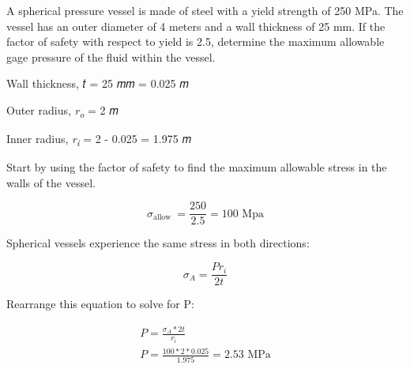 \documentclass[
  letterpaper,
  DIV=11,
  numbers=noendperiod]{scrreprt}
\begin{document}
\begin{tcolorbox}[enhanced jigsaw, breakable, opacityback=0, toptitle=1mm, left=2mm, colback=white, opacitybacktitle=0.6, colframe=quarto-callout-note-color-frame, titlerule=0mm, arc=.35mm, leftrule=.75mm, bottomtitle=1mm, colbacktitle=quarto-callout-note-color!10!white, rightrule=.15mm, title={Example 13.3: Needs title}, bottomrule=.15mm, toprule=.15mm, coltitle=black]

A spherical pressure vessel is made of steel with a yield strength of
250 MPa. The vessel has an outer diameter of 4 meters and a wall
thickness of 25 mm. If the factor of safety with respect to yield is
2.5, determine the maximum allowable gage pressure of the fluid within
the vessel.

\begin{tcolorbox}[enhanced jigsaw, breakable, opacityback=0, toptitle=1mm, left=2mm, colback=white, opacitybacktitle=0.6, colframe=quarto-callout-note-color-frame, titlerule=0mm, arc=.35mm, leftrule=.75mm, bottomtitle=1mm, colbacktitle=quarto-callout-note-color!10!white, rightrule=.15mm, title={Solution}, bottomrule=.15mm, toprule=.15mm, coltitle=black]

Wall thickness, 𝑡 = 25 𝑚𝑚 = 0.025 𝑚

Outer radius, \emph{r\textsubscript{o}} = 2 𝑚

Inner radius, \emph{r\textsubscript{i}} = 2 - 0.025 = 1.975 𝑚

Start by using the factor of safety to find the maximum allowable stress
in the walls of the vessel.

\[
\sigma_{\text {allow }}=\frac{250}{2.5}=100 \text{ Mpa}
\]

Spherical vessels experience the same stress in both directions:

\[
\sigma_A=\frac{P r_i}{2 t}
\]

Rearrange this equation to solve for P:

\[
\begin{gathered}
P=\frac{\sigma_A * 2 t}{r_i} \\
P=\frac{100 * 2 * 0.025}{1.975}=2.53 \text{ MPa}
\end{gathered}
\]

\end{tcolorbox}

\end{tcolorbox}
\end{document}
